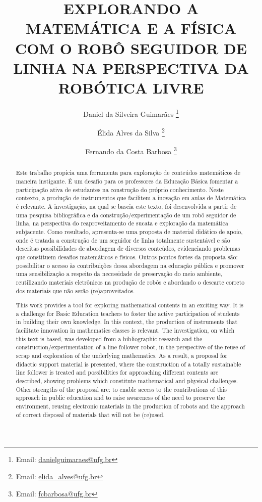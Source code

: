 \documentclass{textolivre-html}
\title{EXPLORANDO A {MATEMÁTICA} E A FÍSICA COM O ROBÔ SEGUIDOR DE LINHA NA PERSPECTIVA DA ROBÓTICA LIVRE}
\author[1]{Daniel da Silveira Guimarães \orcid{0000-0003-1973-9609} \thanks{Email: \url{danielguimaraes@ufg.br}}}
\author[1]{Élida Alves da Silva \orcid{0000-0001-5417-9083} \thanks{Email: \url{elida_alves@ufg.br}}}
\author[1]{Fernando da Costa Barbosa \orcid{0000-0001-8558-3521} \thanks{Email: \url{fcbarbosa@ufg.br}}}
\affil[1]{Universidade Federal de Goiás, Brasil.}
\begin{document}
\maketitle

\begin{poliabstract}
\begin{abstract}
Este trabalho propicia uma ferramenta para exploração de conteúdos matemáticos 
de maneira instigante. É um desafio para os professores da Educação Básica
fomentar a participação ativa de estudantes na construção do próprio
conhecimento. Neste contexto, a produção de instrumentos que facilitem a
inovação em aulas de Matemática é relevante. A investigação, na qual se baseia
este texto, foi desenvolvida a partir de uma pesquisa bibliográfica e da
construção/experimentação de um robô seguidor de linha, na perspectiva do
reaproveitamento de sucata e exploração da matemática subjacente. Como
resultado, apresenta-se uma proposta de material didático de apoio, onde é
tratada a construção de um seguidor de linha totalmente sustentável e são
descritas possibilidades de abordagem de diversos conteúdos, evidenciando
problemas que constituem desafios matemáticos e físicos. Outros pontos fortes
da proposta são: possibilitar o acesso às contribuições dessa abordagem na
educação pública e promover uma sensibilização a respeito da necessidade de
preservação do meio ambiente, reutilizando materiais eletrônicos na produção de
robôs e abordando o descarte correto dos materiais que não serão
(re)aproveitados.

\end{abstract}

\begin{english}
\begin{abstract}
This work provides a tool for exploring mathematical contents in an exciting
way. It is a challenge for Basic Education teachers to foster the active
participation of students in building their own knowledge. In this context, the
production of instruments that facilitate innovation in mathematics classes is
relevant. The investigation, on which this text is based, was developed from a
bibliographic research and the construction/experimentation of a line follower
robot, in the perspective of the reuse of scrap and exploration of the
underlying mathematics. As a result, a proposal for didactic support material
is presented, where the construction of a totally sustainable line follower is
treated and possibilities for approaching different contents are described,
showing problems which constitute mathematical and physical challenges. Other
strengths of the proposal are: to enable access to the contributions of this
approach in public education and to raise awareness of the need to preserve the
environment, reusing electronic materials in the production of robots and the
approach of correct disposal of materials that will not be (re)used.


\end{abstract}
\end{english}
\end{poliabstract}
\end{document}
